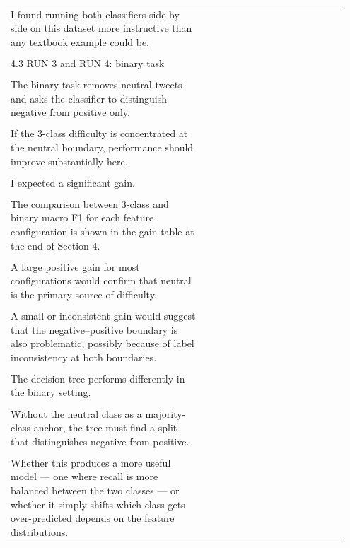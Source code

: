 \documentclass[11pt]{article}
\begin{document}
\begin{longtable}{|p{0.55\linewidth}|p{0.40\linewidth}|}
\hline
\rule{0pt}{3.5cm} & \\
\hline
I found running both classifiers side by side on this dataset more instructive than any textbook example could be. & \\[2pt]
\hline
\rule{0pt}{3.5cm} & \\
\hline
4.3 RUN 3 and RUN 4: binary task & \\[2pt]
\hline
\rule{0pt}{3.5cm} & \\
\hline
The binary task removes neutral tweets and asks the classifier to distinguish negative from positive only. & \\[2pt]
\hline
\rule{0pt}{3.5cm} & \\
\hline
If the 3-class difficulty is concentrated at the neutral boundary, performance should improve substantially here. & \\[2pt]
\hline
\rule{0pt}{3.5cm} & \\
\hline
I expected a significant gain. & \\[2pt]
\hline
\rule{0pt}{3.5cm} & \\
\hline
The comparison between 3-class and binary macro F1 for each feature configuration is shown in the gain table at the end of Section 4. & \\[2pt]
\hline
\rule{0pt}{3.5cm} & \\
\hline
A large positive gain for most configurations would confirm that neutral is the primary source of difficulty. & \\[2pt]
\hline
\rule{0pt}{3.5cm} & \\
\hline
A small or inconsistent gain would suggest that the negative--positive boundary is also problematic, possibly because of label inconsistency at both boundaries. & \\[2pt]
\hline
\rule{0pt}{3.5cm} & \\
\hline
The decision tree performs differently in the binary setting. & \\[2pt]
\hline
\rule{0pt}{3.5cm} & \\
\hline
Without the neutral class as a majority-class anchor, the tree must find a split that distinguishes negative from positive. & \\[2pt]
\hline
\rule{0pt}{3.5cm} & \\
\hline
Whether this produces a more useful model --- one where recall is more balanced between the two classes --- or whether it simply shifts which class gets over-predicted depends on the feature distributions. & \\[2pt]
\hline

\end{longtable}
\end{document}
